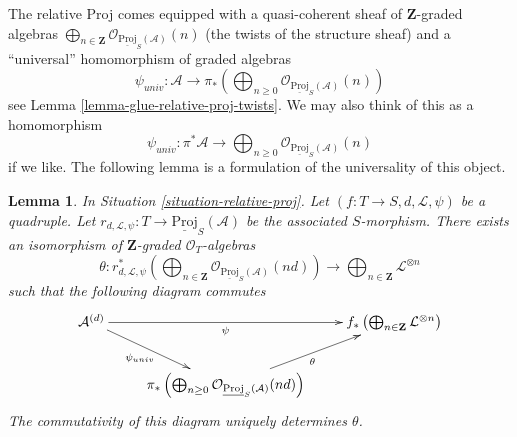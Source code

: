 \documentclass{stacks-project}
\theoremstyle{plain}
\newtheorem{lemma}[subsection]{Lemma}
\theoremstyle{definition}
\theoremstyle{remark}
\numberwithin{equation}{subsection}
\begin{document}
\noindent
The relative Proj comes equipped with a quasi-coherent
sheaf of $\mathbf{Z}$-graded algebras
$\bigoplus_{n \in \mathbf{Z}}
\mathcal{O}_{\underline{\text{Proj}}_S(\mathcal{A})}(n)$
(the twists of the structure sheaf) and
a ``universal'' homomorphism of graded algebras
$$
\psi_{univ} :
\mathcal{A}
\longrightarrow
\pi_*\left(
\bigoplus\nolimits_{n \geq 0}
\mathcal{O}_{\underline{\text{Proj}}_S(\mathcal{A})}(n)
\right)
$$
see Lemma \ref{lemma-glue-relative-proj-twists}. We may also think of this
as a homomorphism
$$
\psi_{univ} :
\pi^*\mathcal{A}
\longrightarrow
\bigoplus\nolimits_{n \geq 0}
\mathcal{O}_{\underline{\text{Proj}}_S(\mathcal{A})}(n)
$$
if we like. The following lemma is a formulation of the
universality of this object.

\begin{lemma}
\label{lemma-tie-up-psi}
In Situation \ref{situation-relative-proj}.
Let $(f : T \to S, d, \mathcal{L}, \psi)$
be a quadruple. Let
$r_{d, \mathcal{L}, \psi} : T \to \underline{\text{Proj}}_S(\mathcal{A})$
be the associated $S$-morphism.
There exists an isomorphism
of $\mathbf{Z}$-graded $\mathcal{O}_T$-algebras
$$
\theta :
r_{d, \mathcal{L}, \psi}^*\left(
\bigoplus\nolimits_{n \in \mathbf{Z}}
\mathcal{O}_{\underline{\text{Proj}}_S(\mathcal{A})}(nd)
\right)
\longrightarrow
\bigoplus\nolimits_{n \in \mathbf{Z}} \mathcal{L}^{\otimes n}
$$
such that the following diagram commutes
$$
\xymatrix{
\mathcal{A}^{(d)} \ar[rr]_-{\psi}
 \ar[rd]_-{\psi_{univ}} & &
f_*\left(
\bigoplus\nolimits_{n \in \mathbf{Z}}
\mathcal{L}^{\otimes n}
\right) \\
 &
\pi_*\left(
\bigoplus\nolimits_{n \geq 0}
\mathcal{O}_{\underline{\text{Proj}}_S(\mathcal{A})}(nd)
\right) \ar[ru]_\theta
}
$$
The commutativity of this diagram uniquely determines $\theta$.
\end{lemma}
\end{document}
